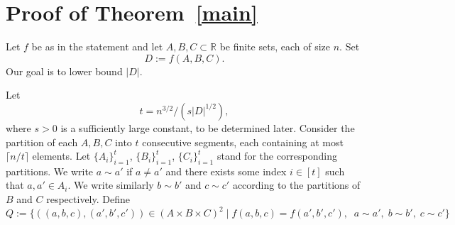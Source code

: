 \documentclass[letterpaper, reqno,11pt]{article}
\newcommand{\RR}{\mathbb{R}}
\theoremstyle{definition}
\theoremstyle{remark}
\begin{document}
\section{Proof of Theorem~\ref{main}}
Let $f$ be as in the statement and let $A,B,C\subset \RR$ be finite sets, each of size $n$. 
Set
$$
D:=f(A,B,C).$$ 
Our goal is to lower bound $|D|$. 

Let 
$$
t=n^{3/2}/(s|D|^{1/2}),$$ where $s>0$ is a sufficiently large constant, to be determined later. Consider the partition of each $A,B, C$ into $t$ consecutive segments, each containing at most $\lceil n/t\rceil $ elements.
Let $\{A_i\}_{i=1}^t$, $\{B_i\}_{i=1}^t$, $\{C_i\}_{i=1}^t$ stand for the corresponding partitions. 
We write $a\sim a'$ if $a\neq a'$ and there exists some index $i\in [t]$ such that $a,a'\in A_i$. We write similarly $b\sim b'$ and $c\sim c'$ according to the partitions of $B$ and $C$ respectively. Define
$$
Q:=\{((a,b,c), (a',b',c'))\in (A\times B\times C)^2\mid f(a,b,c)=f(a',b',c'),\;\;a\sim a',\;b\sim b',\;c\sim c'\}
$$
\end{document}
